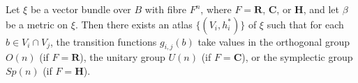 Let $\xi$ be a vector bundle over $B$ with fibre $F^n$, where $F = \mathbf{R}$, $\mathbf{C}$, or $\mathbf{H}$, and let $\beta$ be a metric on $\xi$. Then there exists an atlas $\{(V_i, h_i^*)\}$ of $\xi$ such that for each $b \in V_i \cap V_j$, the transition functions $g_{i,j}(b)$ take values in the orthogonal group $O(n)$ (if $F = \mathbf{R}$), the unitary group $U(n)$ (if $F = \mathbf{C}$), or the symplectic group $Sp(n)$ (if $F = \mathbf{H}$).
